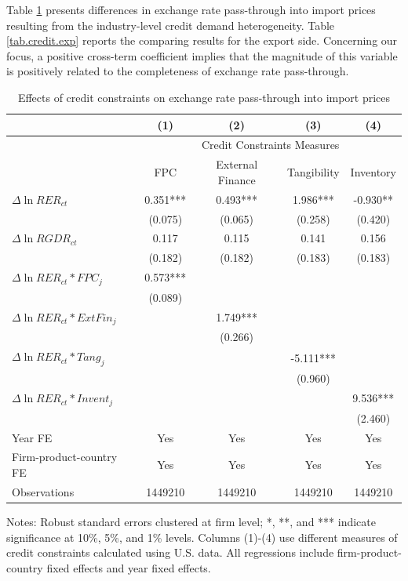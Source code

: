 \documentclass[12pt]{article}
\begin{document}
Table \ref{tab.credit} presents differences in exchange rate pass-through into import prices resulting from the industry-level credit demand heterogeneity. Table \ref{tab.credit.exp} reports the comparing results for the export side. Concerning our focus, a positive cross-term coefficient implies that the magnitude of this variable is positively related to the completeness of exchange rate pass-through.

\begin{table}[htb]
	\centering
	\caption{Effects of credit constraints on exchange rate pass-through into import prices}
	\begin{threeparttable}	
		\begin{tabular}{lcccc}
			\toprule
			& (1)   & (2)   & (3)   & (4) \\
			\midrule
			 & \multicolumn{4}{c}{Credit Constraints Measures} \\
			& FPC   & External Finance & Tangibility & Inventory \\
			\midrule
			$\Delta \ln RER_{ct}$ & 0.351*** & 0.493*** & 1.986*** & -0.930** \\
			& (0.075) & (0.065) & (0.258) & (0.420) \\
			$\Delta \ln RGDR_{ct}$ & 0.117 & 0.115 & 0.141 & 0.156 \\
			& (0.182) & (0.182) & (0.183) & (0.183) \\
			$\Delta \ln RER_{ct}*FPC_{j}$ & 0.573*** &       &       &  \\
			& (0.089) &       &       &  \\
			$\Delta \ln RER_{ct}*ExtFin_{j}$ &    & 1.749*** &       &  \\
			&   & (0.266) &       &  \\
			$\Delta \ln RER_{ct}*Tang_{j}$ &   &       & -5.111*** &  \\
			&   &       & (0.960) &  \\
			$\Delta \ln RER_{ct}*Invent_{j}$ &    &       &       & 9.536*** \\
			&   &       &       & (2.460) \\
			Year FE  & Yes   & Yes   & Yes   & Yes \\
			Firm-product-country FE & Yes   & Yes   & Yes   & Yes \\
			Observations & 1449210 & 1449210 & 1449210 & 1449210 \\
			\bottomrule
		\end{tabular}
		\begin{tablenotes}
			\footnotesize
			\item[Notes:] Robust standard errors clustered at firm level;  *, **, and *** indicate significance at 10\%, 5\%, and 1\% levels. Columns (1)-(4) use different measures of credit constraints calculated using U.S. data. All regressions include firm-product-country fixed effects and year fixed effects.
		\end{tablenotes}
	\end{threeparttable}
	\label{tab.credit}
\end{table}
\end{document}
